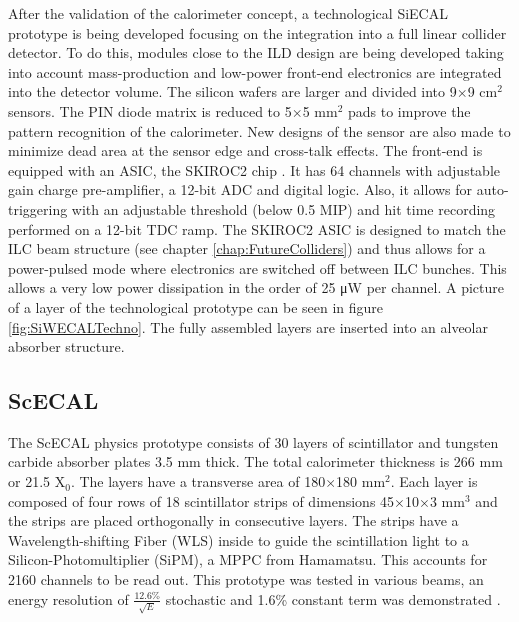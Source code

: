 After the validation of the calorimeter concept, a technological SiECAL prototype is being developed focusing on the integration into a full linear collider detector. To do this, modules close to the ILD design are being developed taking into account mass-production and low-power front-end electronics are integrated into the detector volume. The silicon wafers are larger and divided into 9$\times$9 cm$^2$ sensors. The PIN diode matrix is reduced to 5$\times$5 mm$^2$ pads to improve the pattern recognition of the calorimeter. New designs of the sensor are also made to minimize dead area at the sensor edge and cross-talk effects. The front-end is equipped with an ASIC, the SKIROC2 chip \cite{1748-0221-6-12-C12040}. It has 64 channels with adjustable gain charge pre-amplifier, a 12-bit ADC and digital logic. Also, it allows for auto-triggering with an adjustable threshold (below 0.5 MIP) and hit time recording performed on a 12-bit TDC ramp. The SKIROC2 ASIC is designed to match the ILC beam structure (see chapter \ref{chap:FutureColliders}) and thus allows for a power-pulsed mode where electronics are switched off between ILC bunches. This allows a very low power dissipation in the order of 25 \si{\micro\watt} per channel. A picture of a layer of the technological prototype can be seen in figure \ref{fig:SiWECALTechno}. The fully assembled layers are inserted into an alveolar absorber structure.

\subsection{ScECAL}
\label{subsec:ScECAL}

The ScECAL physics prototype \cite{1707.07126v2} consists of 30 layers of scintillator and tungsten carbide absorber plates 3.5 mm thick. The total calorimeter thickness is 266 mm or 21.5 X$_0$. The layers have a transverse area of 180$\times$180 mm$^2$. Each layer is composed of four rows of 18 scintillator strips of dimensions 45$\times$10$\times$3 mm$^3$ and the strips are placed orthogonally in consecutive layers. The strips have a Wavelength-shifting Fiber (WLS) inside to guide the scintillation light to a Silicon-Photomultiplier (SiPM), a MPPC from Hamamatsu. This accounts for 2160 channels to be read out. This prototype was tested in various beams, an energy resolution of $\frac{12.6\%}{\sqrt{E}}$ stochastic and 1.6\% constant term was demonstrated \cite{1707.07126v2}.

